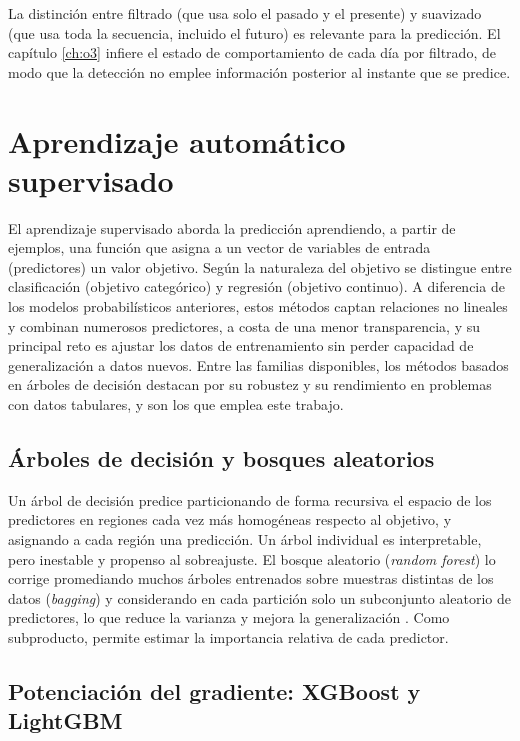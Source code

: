 La distinción entre filtrado (que usa solo el pasado y el presente) y suavizado (que
usa toda la secuencia, incluido el futuro) es relevante para la predicción. El
capítulo \ref{ch:o3} infiere el estado de comportamiento de cada día por filtrado,
de modo que la detección no emplee información posterior al instante que se predice.

\section{Aprendizaje automático supervisado}
\label{sec:prelim-ml}

El aprendizaje supervisado aborda la predicción aprendiendo, a partir de ejemplos,
una función que asigna a un vector de variables de entrada (predictores) un valor
objetivo. Según la naturaleza del objetivo se distingue entre clasificación
(objetivo categórico) y regresión (objetivo continuo). A diferencia de los modelos
probabilísticos anteriores, estos métodos captan relaciones no lineales y combinan
numerosos predictores, a costa de una menor transparencia, y su principal reto es
ajustar los datos de entrenamiento sin perder capacidad de generalización a datos
nuevos. Entre las familias disponibles, los métodos basados en árboles de decisión
destacan por su robustez y su rendimiento en problemas con datos tabulares, y son
los que emplea este trabajo.

\subsection{Árboles de decisión y bosques aleatorios}
\label{sec:prelim-rf}

Un árbol de decisión predice particionando de forma recursiva el espacio de los
predictores en regiones cada vez más homogéneas respecto al objetivo, y asignando a
cada región una predicción. Un árbol individual es interpretable, pero inestable y
propenso al sobreajuste. El bosque aleatorio (\textit{random forest}) lo corrige
promediando muchos árboles entrenados sobre muestras distintas de los datos
(\textit{bagging}) y considerando en cada partición solo un subconjunto aleatorio de
predictores, lo que reduce la varianza y mejora la generalización
\cite{breiman2001}. Como subproducto, permite estimar la importancia relativa de
cada predictor.

\subsection{Potenciación del gradiente: XGBoost y LightGBM}
\label{sec:prelim-boosting}

